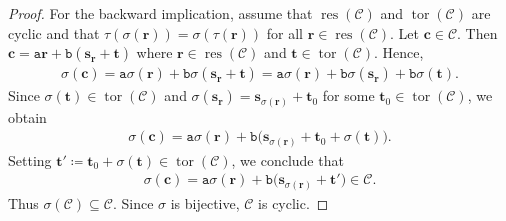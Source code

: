 \documentclass[12pt]{article}
\theoremstyle{definition}
\theoremstyle{plain}
\begin{document}
\begin{proof}
For the backward implication, assume that $\operatorname{res}(\mathcal{C})$ and $\operatorname{tor}(\mathcal{C})$ are cyclic and that
$\tau (\sigma(\mathbf{r})) = \sigma( \tau (\mathbf{r}))
$ for all $\mathbf{r} \in \operatorname{res}(\mathcal{C})$.
Let $\mathbf{c} \in \mathcal{C}$. Then
$
\mathbf{c}
=
\mathtt{a}\mathbf{r} + \mathtt{b}(\mathbf{s}_{\mathbf{r}} + \mathbf{t})
$
where $\mathbf{r} \in \operatorname{res}(\mathcal{C})$ and $\mathbf{t} \in \operatorname{tor}(\mathcal{C})$.
Hence,
\begin{align*}
\sigma(\mathbf{c})
=
\mathtt{a}\sigma(\mathbf{r}) + \mathtt{b}\sigma(\mathbf{s}_{\mathbf{r}} + \mathbf{t})
=
\mathtt{a}\sigma(\mathbf{r}) + \mathtt{b}\sigma(\mathbf{s}_{\mathbf{r}}) + \mathtt{b}\sigma(\mathbf{t}).
\end{align*}
Since $\sigma(\mathbf{t}) \in \operatorname{tor}(\mathcal{C})$ and
$
\sigma(\mathbf{s}_{\mathbf{r}})
=
\mathbf{s}_{\sigma(\mathbf{r})} + \mathbf{t}_0
$
for some $\mathbf{t}_0 \in \operatorname{tor}(\mathcal{C})$,
we obtain
\begin{align*}
\sigma(\mathbf{c})
=
\mathtt{a}\sigma(\mathbf{r})
+ \mathtt{b}\big( \mathbf{s}_{\sigma(\mathbf{r})} + \mathbf{t}_0 + \sigma(\mathbf{t}) \big).
\end{align*}
Setting
$
\mathbf{t}'
\coloneqq
\mathbf{t}_0 + \sigma(\mathbf{t})
\in \operatorname{tor}(\mathcal{C})
$,
we conclude that
\begin{align*}
\sigma(\mathbf{c})
=
\mathtt{a}\sigma(\mathbf{r}) + \mathtt{b}\big( \mathbf{s}_{\sigma(\mathbf{r})} + \mathbf{t}' \big)
\in \mathcal{C}.
\end{align*}
Thus $\sigma(\mathcal{C}) \subseteq \mathcal{C}$. Since $\sigma$ is bijective,
$\mathcal{C}$ is cyclic.
\end{proof}
\end{document}
